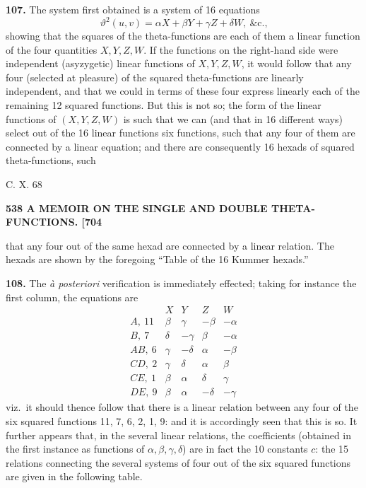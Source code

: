 \documentclass[11pt]{article}
\begin{document}
\medskip
\textbf{107.} The system first obtained is a system of 16 equations
\[
\vartheta^2(u, v) = \alpha X + \beta Y + \gamma Z + \delta W,\ \text{\&c.,}
\]
showing that the squares of the theta-functions are each of them a linear function of the four quantities $X, Y, Z, W$. If the functions on the right-hand side were independent (asyzygetic) linear functions of $X, Y, Z, W$, it would follow that any four (selected at pleasure) of the squared theta-functions are linearly independent, and that we could in terms of these four express linearly each of the remaining 12 squared functions. But this is not so; the form of the linear functions of $(X, Y, Z, W)$ is such that we can (and that in 16 different ways) select out of the 16 linear functions six functions, such that any four of them are connected by a linear equation; and there are consequently 16 hexads of squared theta-functions, such

\medskip
\hfill C. X. \hfill 68

\newpage
\noindent\textbf{538 \hfill A MEMOIR ON THE SINGLE AND DOUBLE THETA-FUNCTIONS. \hfill [704}

\medskip
\noindent that any four out of the same hexad are connected by a linear relation. The hexads are shown by the foregoing ``Table of the 16 Kummer hexads.''

\medskip
\textbf{108.} The \textit{\`a posteriori} verification is immediately effected; taking for instance the first column, the equations are
\[
\begin{array}{l|cccc}
   & X & Y & Z & W\\\hline
A,\ 11   & \beta & \gamma & -\beta & -\alpha\\
B,\ 7    & \delta & -\gamma & \beta & -\alpha\\
AB,\ 6   & \gamma & -\delta & \alpha & -\beta\\
CD,\ 2   & \gamma & \delta & \alpha & \beta\\
CE,\ 1   & \beta & \alpha & \delta & \gamma\\
DE,\ 9   & \beta & \alpha & -\delta & -\gamma
\end{array}
\]
viz.\ it should thence follow that there is a linear relation between any four of the six squared functions 11, 7, 6, 2, 1, 9: and it is accordingly seen that this is so. It further appears that, in the several linear relations, the coefficients (obtained in the first instance as functions of $\alpha,\beta,\gamma,\delta$) are in fact the 10 constants $c$: the 15 relations connecting the several systems of four out of the six squared functions are given in the following table.
\end{document}
